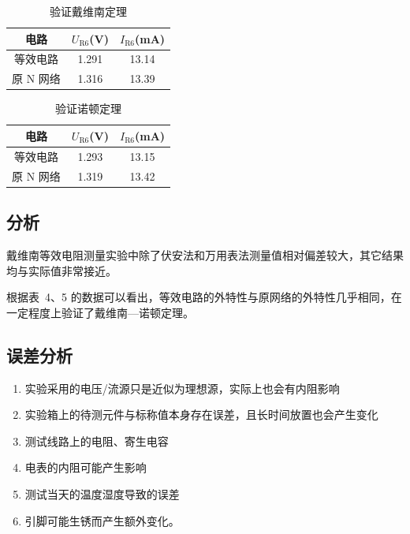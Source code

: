 \documentclass[a4paper,utf8]{article}
\begin{document}
        \begin{table}[!ht]\caption{验证戴维南定理}
            \begin{tabularx}{0.55\textwidth}{CCC} \toprule
                电路 & $U_\text{R6}$(\unit{\V}) & $I_\text{R6}$(\unit{\mA}) \\ \midrule
                等效电路 & 1.291 & 13.14 \\
                原 N 网络 & 1.316 & 13.39 \\ \bottomrule
            \end{tabularx}
        \end{table}

        \begin{table}[!ht]\caption{验证诺顿定理}
            \begin{tabularx}{0.55\textwidth}{CCC} \toprule
                电路 & $U_\text{R6}$(\unit{\V}) & $I_\text{R6}$(\unit{\mA}) \\ \midrule
                等效电路 & 1.293 & 13.15 \\
                原 N 网络 & 1.319 & 13.42 \\ \bottomrule
            \end{tabularx}
        \end{table}

    \subsection{分析}
        戴维南等效电阻测量实验中除了伏安法和万用表法测量值相对偏差较大，其它结果均与实际值非常接近。\par
        根据表~4、5 的数据可以看出，等效电路的外特性与原网络的外特性几乎相同，在一定程度上验证了戴维南—诺顿定理。
    \subsection{误差分析}
        \begin{enumerate}
            \item 实验采用的电压/流源只是近似为理想源，实际上也会有内阻影响
            \item 实验箱上的待测元件与标称值本身存在误差，且长时间放置也会产生变化
            \item 测试线路上的电阻、寄生电容
            \item 电表的内阻可能产生影响
            \item 测试当天的温度湿度导致的误差
            \item 引脚可能生锈而产生额外变化。
        \end{enumerate}
\end{document}

